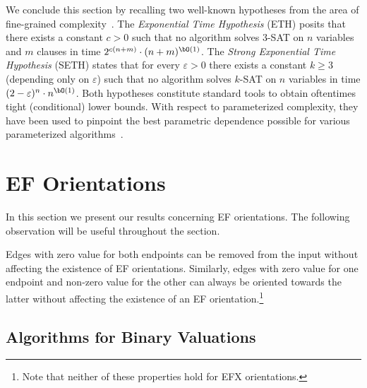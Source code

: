 \documentclass[11pt,letterpaper]{article}
\begin{document}
\begin{toappendix}
We conclude this section by recalling two well-known hypotheses from the area of
fine-grained complexity~\cite{jcss/ImpagliazzoP01,jcss/ImpagliazzoPZ01}.
The \emph{Exponential Time Hypothesis} (ETH) posits that there exists a
constant $c>0$ such that no algorithm solves 3-SAT on $n$ variables and $m$
clauses in time $2^{c (n+m)} \cdot (n + m)^{\bO(1)}$.
The \emph{Strong Exponential Time Hypothesis} (SETH) states that for every
$\varepsilon>0$ there exists a constant $k \ge 3$ (depending only on $\varepsilon$)
such that no algorithm solves $k$-SAT on
$n$ variables in time $(2 - \varepsilon)^{n} \cdot n^{\bO(1)}$.
Both hypotheses constitute standard tools to obtain oftentimes tight (conditional) lower bounds.
With respect to parameterized complexity, they have been used to pinpoint the best parametric dependence possible for various parameterized algorithms~\cite{talg/LokshtanovMS18,siamcomp/LokshtanovMS18}.


\end{toappendix}




\section{EF Orientations}\label{section:EFo}

In this section we present our results concerning EF orientations. The following observation will be useful throughout the section.


\begin{observation}\label{obs:zero_value_goods}
    Edges with zero value for both endpoints can be removed from the input without affecting the existence of EF orientations.
    Similarly, edges with zero value for one endpoint and non-zero value for the other can always be oriented towards the latter without affecting the existence of an EF orientation.\footnote{Note that neither of these properties hold for EFX orientations.}
\end{observation}



\subsection{Algorithms for Binary Valuations}\label{subsec:EFo:linear}
\end{document}
